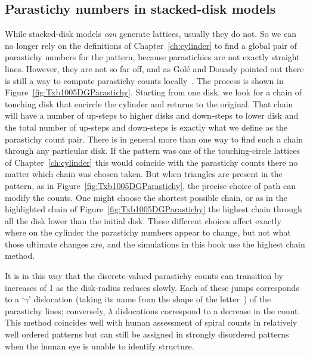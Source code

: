 \subsection{Parastichy numbers in stacked-disk models}
While stacked-disk models \textit{can} generate lattices, usually they do not. 
So we can no longer rely on the  definitions of Chapter~\ref{ch:cylinder}
to find a global pair of parastichy numbers for the pattern, because  parastichies are not exactly straight lines.  However, they are not so far off, and as Gol\'e and Douady pointed out there is still a way to compute parastichy counts locally~\autocite{goleFibonacciQuasisymmetricPhyllotaxis2016}.
The process is shown in Figure~\ref{fig:Txb1005DGParastichy}. Starting from one disk, we look for a chain of touching disk that encircle the cylinder and returns to the original. That chain will have a number of up-steps to higher disks and down-steps to lower disk and the total number of up-steps and down-steps is exactly what we define as the parastichy count pair. 
%
There is in general more than one way to find such a chain through any particular disk. If the pattern was one of the touching-circle lattices of Chapter~\ref{ch:cylinder} this would coincide with the parastichy counts there no matter which chain was chosen taken. But when triangles are present in the pattern, as in Figure~\ref{fig:Txb1005DGParastichy}, the precise choice of path can modify the counts. One might choose the shortest possible chain, or as in the highlighted chain of Figure~\ref{fig:Txb1005DGParastichy} the highest chain through all the disk lower than the initial disk. These different choices affect exactly where on the cylinder the parastichy numbers appear to change, but not what those ultimate changes are, and the simulations in this book use the highest chain method. 

It is in this way that the discrete-valued parastichy counts can transition by increases of 1 as the disk-radius reduces slowly. 
	 Each of these jumps corresponds to a `$\gamma$' dislocation (taking its name from the shape of the letter~\cite{zagorska-marekPhyllotacticPatternsTransitions1985}) of the parastichy lines; conversely, $\lambda$ dislocations correspond to a decrease in the count.
This method coincides well with human assessment of spiral counts in relatively well ordered patterns but can still be assigned in strongly disordered patterns when the human eye is unable to identify structure. 


